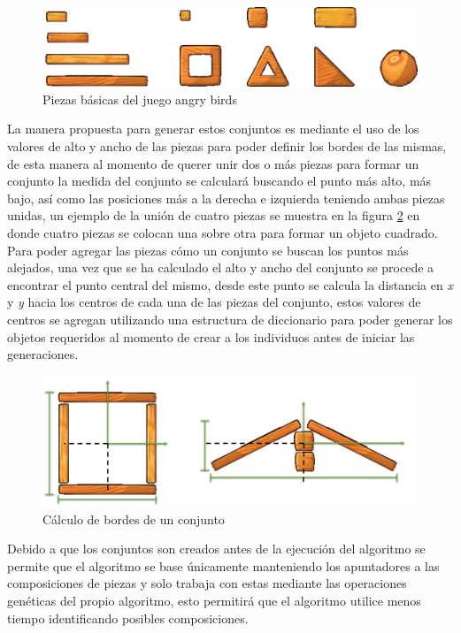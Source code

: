 \begin{figure}
  \centering
  \includegraphics[width=1.0\textwidth]{img/list_pieces.png}
  \caption{Piezas básicas del juego angry birds}
  \label{figure:game-basic-blocks}
\end{figure}

La manera propuesta para generar estos conjuntos es mediante el uso de los
valores de alto y ancho de las piezas para poder definir los bordes de las
mismas, de esta manera al momento de querer unir dos o más piezas para formar un
conjunto la medida del conjunto se calculará buscando el punto más alto, más
bajo, así como las posiciones más a la derecha e izquierda teniendo ambas piezas
unidas, un ejemplo de la unión de cuatro piezas se muestra en la figura
\ref{figure:bounding-box-calculation} en donde cuatro piezas se colocan una
sobre otra para formar un objeto cuadrado. Para poder agregar las piezas cómo
un conjunto se buscan los puntos más alejados, una vez que se ha calculado el
alto y ancho del conjunto se procede a encontrar el punto central del mismo,
desde este punto se calcula la distancia en \textit{x} y \textit{y} hacia los
centros de cada una de las piezas del conjunto, estos valores de centros se
agregan utilizando una estructura de diccionario para poder generar los objetos requeridos al
momento de crear a los individuos antes de iniciar las generaciones.

\begin{figure}
  \centering
  \includegraphics[width=1.0\textwidth]{img/bounding_box_calculation.png}
  \caption{Cálculo de bordes de un conjunto}
  \label{figure:bounding-box-calculation}
\end{figure}

Debido a que los conjuntos son creados antes de la ejecución del algoritmo se
permite que el algoritmo se base únicamente manteniendo los apuntadores a las
composiciones de piezas y solo trabaja con estas mediante las operaciones
genéticas del propio algoritmo, esto permitirá que el algoritmo utilice menos
tiempo identificando posibles composiciones.

